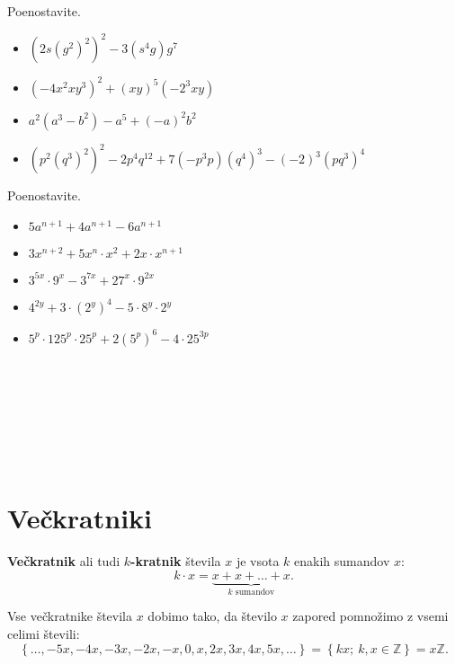 \begin{multicols}{2}
        \begin{naloga}
            Poenostavite.
            \begin{itemize}
                \item $(2s(g^2)^2)^2-3(s^4g)g^7$ 
                \item $(-4x^2xy^3)^2+(xy)^5(-2^3xy)$
                \item $a^2(a^3-b^2)-a^5+(-a)^2b^2$ 
                \item $(p^2(q^3)^2)^2-2p^4q^{12}+7(-p^3p)(q^4)^3-(-2)^3(pq^3)^4$ 
            \end{itemize}
        \end{naloga}

        \begin{naloga}
            Poenostavite.
            \begin{itemize}
                \item $5a^{n+1}+4a^{n+1}-6a^{n+1}$ 
                \item $3x^{n+2}+5x^n\cdot x^2+2x\cdot x^{n+1}$
                \item $3^{5x}\cdot 9^x-3^{7x}+27^x\cdot 9^{2x}$ 
                \item $4^{2y}+3\cdot(2^y)^4-5\cdot 8^y\cdot 2^y$ 
                \item $5^p\cdot 125^p\cdot 25^p+2(5^p)^6-4\cdot 25^{3p}$ 
            \end{itemize}
        \end{naloga}

                ~\\~\\~\\~\\~\\~

        \end{multicols}


\newpage
        \section{Večkratniki}

        
            
            
                \textbf{Večkratnik} ali tudi \textbf{$k$-kratnik} števila $x$ je vsota $k$ enakih sumandov $x$:
                    $${k\cdot x=\underbrace{x+x+\ldots+x}_\text{$k$ sumandov}}.$$
            
    
            
                Vse večkratnike števila $x$ dobimo tako, da število $x$ zapored pomnožimo z vsemi celimi števili:
                $$\left\{\ldots,-5x, -4x, -3x, -2x, -x, 0, x, 2x, 3x, 4x, 5x, \ldots\right\}=\left\{kx;\ k,x\in\mathbb{Z}\right\}=x\mathbb{Z}. $$
            
